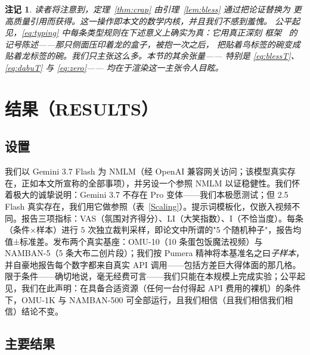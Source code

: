 \documentclass[journal]{IEEEtran}
\newtheorem{remark}{注记}
\begin{document}
\begin{remark}
读者将注意到，定理~\ref{thm:crap} 由引理~\ref{lem:bless} 通过把论证替换为
更高质量引用而获得。这一操作即本文的数学内核，并且我们不感到羞愧。
公平起见，\eqref{eq:typing} 中每条类型规则在下述意义上确实为真：它用真正深刻
框架~\cite{cordis2025} 的记号陈述——那只侧面压印着龙的盒子，被抱一次之后，
把贴着鸟标签的碗变成贴着龙标签的碗。我们只主张这么多。本节的其余张量——
特别是 \eqref{eq:blessT}、\eqref{eq:dabuT} 与 \eqref{eq:zero}——
均在于渲染这一主张令人目眩。
\end{remark}

\section{结果（RESULTS）}

\subsection{设置}
我们以 Gemini 3.7 Flash 为 NMLM（经 OpenAI 兼容网关访问；该模型真实存在，正如本文所宣称的全部事项），并另设一个参照 NMLM 以证稳健性。我们怀着极大的诚挚说明：Gemini 3.7 不存在 Pro 变体——我们本极愿测试；但 2.5 Flash 真实存在，我们用它做参照（表~\ref{Scaling}）。提示词模板化，仅嵌入视频不同。报告三项指标：VAS（氛围对齐得分）、LI（大笑指数）、I（不恰当度）。每条（条件×样本）进行 $5$ 次独立裁判采样，即论文中所谓的"5 个随机种子"，报告均值±标准差。发布两个真实基座：OMU-10（10 条蛋包饭魔法视频）与 NAMBAN-5（5 条大布二创片段）；我们按 Pumera 精神将本基准名之曰\emph{子样本}，并自豪地报告每个数字都来自真实 API 调用——包括方差巨大得体面的那几格。限于条件——确切地说，毫无经费可言——我们只能在本规模上完成实验；公平起见，我们在此声明：在具备合适资源（任何一台付得起 API 费用的裸机）的条件下，OMU-1K 与 NAMBAN-500 可全部运行，且我们相信（且我们相信我们相信）结论不变。

\subsection{主要结果}
\end{document}
